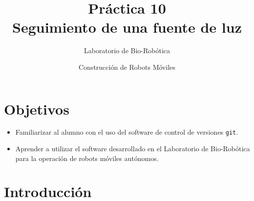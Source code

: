 \documentclass[letterpaper,12pt]{article}
\title{Práctica 10 \\ Seguimiento de una fuente de luz}
\author{Laboratorio de Bio-Robótica}
\date{Construcción de Robots Móviles}
\begin{document}
\renewcommand{\tablename}{Tabla}
\maketitle
\section*{Objetivos}
\begin{itemize}
\item Familiarizar al alumno con el uso del software de control de versiones \texttt{git}.
\item Aprender a utilizar el software desarrollado en el Laboratorio de Bio-Robótica para la operación de robots móviles autónomos. 
\end{itemize}

\section{Introducción}
\end{document}
